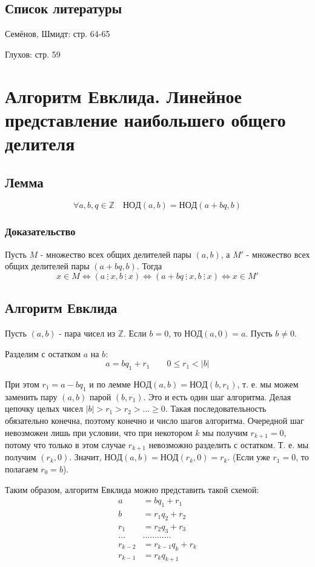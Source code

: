 \documentclass{article}
\newcommand{\cgcd}{\mathrm{НОД}}
\newcommand{\divs}{~\vdots~}
\begin{document}
\subsection*{Список литературы}
Семёнов, Шмидт: стр. 64-65

Глухов: стр. 59


\newpage
\section{Алгоритм Евклида. Линейное представление наибольшего общего делителя}
\subsection{Лемма}
\[\forall a, b, q \in \mathbb Z \quad \cgcd(a, b) = \cgcd(a + bq, b)\]
\subsubsection*{Доказательство}
Пусть $M$ - множество всех общих делителей пары $(a, b)$, а $M'$ - множество всех общих делителей пары $(a + bq, b)$. Тогда
\[x \in M \Leftrightarrow (a \divs x, b \divs x) \Leftrightarrow (a + bq \divs x, b \divs x) \Leftrightarrow x \in M'\]

\subsection{Алгоритм Евклида}
Пусть $(a, b)$ - пара чисел из $\mathbb Z$. Если $b = 0$, то $\cgcd(a, 0) = a$. Пусть $b \neq 0$.

Разделим с остатком $a$ на $b$:
\[a = bq_1 + r_1 \qquad 0 \leq r_1 < |b|\]

При этом $r_1 = a - bq_1$ и по лемме $\cgcd(a, b) = \cgcd(b, r_1)$, т. е. мы можем заменить пару $(a, b)$ парой $(b, r_1)$. Это и есть один шаг алгоритма. Делая цепочку целых чисел ${|b| > r_1 > r_2 > \dots \geq 0}$. Такая последовательность обязательно конечна, поэтому конечно и число шагов алгоритма. Очередной шаг невозможен лишь при условии, что при некотором $k$ мы получим $r_{k+1} = 0$, потому что только в этом случае $r_{k+1}$ невозможно разделить с остатком. Т. е. мы получим $(r_k, 0)$. Значит, $\cgcd(a, b) = \cgcd(r_k, 0) = r_k$. (Если уже $r_1 = 0$, то полагаем $r_0 = b$).

Таким образом, алгоритм Евклида можно представить такой схемой:
\begin{align*}
a &= bq_1 + r_1		\\
b &= r_1q_2 + r_2	\\
r_1 &= r_2q_3 + r_3	\\
\dots & \dots \dots \dots \dots		\\
r_{k-2} &= r_{k-1}q_k + r_k	\\
r_{k-1} &= r_kq_{k+1}
\end{align*}
\end{document}
